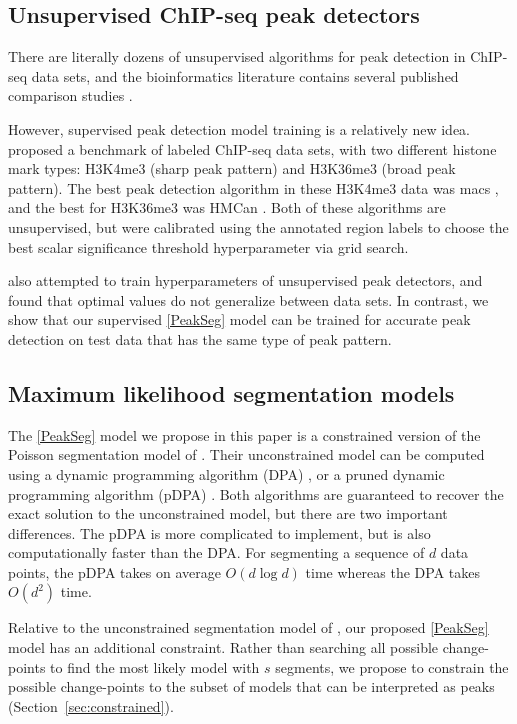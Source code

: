 \documentclass{article}
\begin{document}
\subsection{Unsupervised ChIP-seq peak detectors}

There are literally dozens of unsupervised algorithms for peak
detection in ChIP-seq data sets, and the bioinformatics literature
contains several published comparison studies \citep{evaluation2010,
  rye2010manually, chip-seq-bench}. 

However, supervised peak detection model training is a relatively new
idea. \citet{hocking2014visual} proposed a benchmark of labeled
ChIP-seq data sets, with two different histone mark types: H3K4me3
(sharp peak pattern) and H3K36me3 (broad peak pattern). The best peak
detection algorithm in these H3K4me3 data was macs \citep{MACS}, and
the best for H3K36me3 was HMCan \citep{HMCan}. Both of these
algorithms are unsupervised, but were calibrated using the annotated
region labels to choose the best scalar significance threshold
hyperparameter via grid search.

\citet{DFilter} also attempted to train hyperparameters of
unsupervised peak detectors, and \citet{picking2012} found that
optimal values do not generalize between data sets. In contrast, we
show that our supervised \ref{PeakSeg} model can be trained for
accurate peak detection on test data that has the same type of peak
pattern.

\subsection{Maximum likelihood segmentation models}

The \ref{PeakSeg} model we propose in this paper is a constrained
version of the Poisson segmentation model of \citet{Segmentor}.
Their unconstrained model can be computed using a dynamic programming
algorithm (DPA) \citep{bellman}, or a pruned dynamic programming
algorithm (pDPA) \citep{pruned-dp}. Both algorithms are guaranteed to
recover the exact solution to the unconstrained model, but there are
two important differences. The pDPA is more complicated to implement,
but is also computationally faster than the DPA. For segmenting a
sequence of $d$ data points, the pDPA takes on average $O(d\log d)$
time whereas the DPA takes $O(d^2)$ time. 

Relative to the unconstrained segmentation model of \citet{Segmentor},
our proposed \ref{PeakSeg} model has an additional constraint. Rather
than searching all possible change-points to find the most likely
model with $s$ segments, we propose to constrain the possible
change-points to the subset of models that can be interpreted as peaks
(Section~\ref{sec:constrained}).
\end{document}
